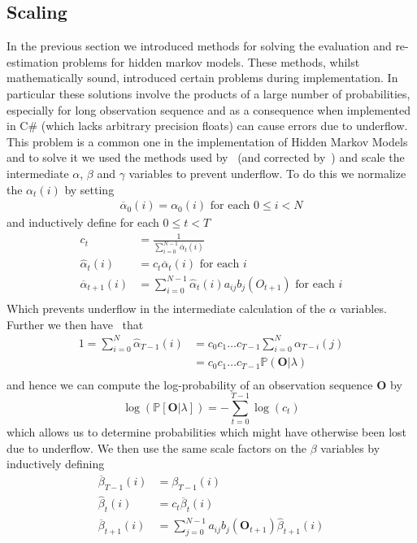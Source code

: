 \subsection{Scaling}
In the previous section we introduced methods for solving the evaluation and re-estimation problems for hidden markov models. These methods, whilst mathematically sound, introduced certain problems during implementation. In particular these solutions involve the products of a large number of probabilities, especially for long observation sequence and as a consequence when implemented in C\# (which lacks arbitrary precision floats) can cause errors due to underflow. This problem is a common one in the implementation of Hidden Markov Models and to solve it we used the methods used by~\citet{rabiner1989tutorial} (and corrected by~\cite{rahimi2000})  and scale the intermediate $\alpha$, $\beta$ and $\gamma$ variables to prevent underflow. To do this we normalize the $\alpha_t(i)$ by setting
\begin{align*}
\overline{\alpha}_0(i) = \alpha_0(i) \text{ for each $0\leq i<N$} 
\end{align*}
and inductively define for each $0\leq t < T$
\begin{align*}
c_t &= \frac{1}{\sum_{i=0}^{N-1}\overline{\alpha}_t(i)}\\
\hat{\alpha}_t(i) &= c_t\overline{\alpha}_t(i)\text{ for each $i$}\\
\overline{\alpha}_{t+1}(i) &= \sum_{i=0}^{N-1}\hat{\alpha}_t(i)a_{ij}b_j(O_{t+1}) \text{ for each $i$}\\
\end{align*}
Which prevents underflow in the intermediate calculation of the $\alpha$ variables. Further we then have~\citep{rabiner1989tutorial} that
\begin{align*}
1 = \sum_{i=0}^{N}\hat{\alpha}_{T-1}(i) &= c_0c_1\dots c_{T-1}\sum_{i=0}^{N}\alpha_{T-i}(j)\\
&=c_0c_1\dots c_{T-1}\mathbb{P}(\mathbf{O}|\lambda)\\
\end{align*}
and hence we can compute the log-probability of an observation sequence $\mathbf{O}$ by
\begin{equation*}
\log(\mathbb{P}[\mathbf{O}|\lambda]) = -\sum_{t=0}^{T-1}\log(c_t)
\end{equation*}
which allows us to determine probabilities which might have otherwise been lost due to underflow. 
We then use the same scale factors on the $\beta$ variables by inductively defining
\begin{align*}
\overline{\beta}_{T-1}(i) &= \beta_{T-1}(i) \\
\hat{\beta}_{t}(i) &= c_t\overline{\beta}_t(i)\\
\overline{\beta}_{t+1}(i) &= \sum_{j=0}^{N-1}a_{ij}b_j(\mathbf{O}_{t+1})\hat{\beta}_{t+1}(i)
\end{align*}
